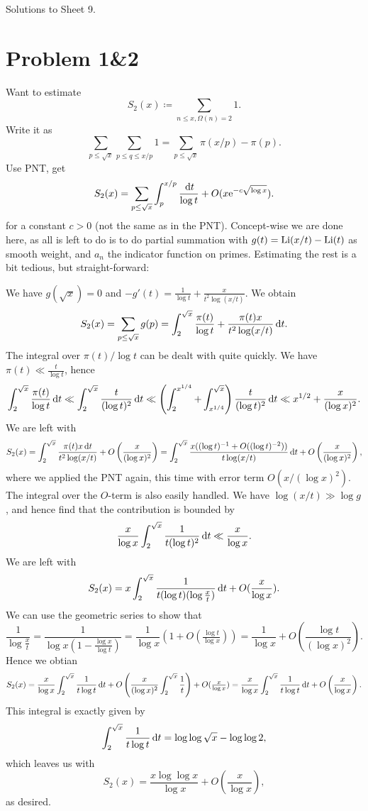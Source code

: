 \documentclass[a4paper,11pt]{article}
\author{Max von Consbruch}
\begin{document}
\begin{center}
    \huge{Solutions to Sheet 9.}
\end{center}

\section*{Problem 1\&2}

Want to estimate
\[
    S_2(x) \coloneqq \sum_{n \leq x, \Omega(n) = 2} 1.
\]
Write it as 
\[
    \sum_{p \leq \sqrt x} \sum_{p \leq q \leq x/p} 1 = \sum_{p \leq \sqrt x}
    \pi(x/p) - \pi(p).
\]
Use PNT, get 
\[
    S_2(x) = \sum_{p \leq \sqrt x} \int_p^{x/p} \frac {\mathrm{\,d} t}{\log t} +
    O(x \mathrm e^{-c\sqrt{\log x}} ).
\]
for a constant $c>0$ (not the same as in the PNT).
Concept-wise we are done here, as all is left to do is to do partial summation
with $g(t) = \mathrm{Li}(x/t) - \mathrm{Li}(t)$ as smooth weight, and $a_n$ the indicator
function on primes. Estimating the rest is a bit tedious, but straight-forward:

We have $g(\sqrt x) = 0$ and $-g'(t) = \frac 1 {\log t} + \frac{x}{t^2
\log(x/t)}$. We obtain
\[
    S_2(x) = \sum_{p \leq \sqrt x} g(p) = 
    \int_2^{\sqrt x} \frac{\pi(t)}{\log t} + \frac{\pi(t) x}{t^2 \log(x/t)}
    \mathrm{\,d} t.
\]
The integral over $\pi(t)/\log t$ can be dealt with quite quickly. We have 
$\pi(t) \ll \frac t{\log t}$, hence
\[
    \int_2^{\sqrt x} \frac{\pi(t)}{\log t} \mathrm{\,d} t
    \ll \int_2^{\sqrt x} \frac t{(\log t)^2} \mathrm{\,d} t
    \ll \left( \int_{2}^{x^{1/4}} + 
    \int_{x^{1/4}}^{\sqrt x} \right )\frac{t}{(\log t)^2} \mathrm{\,d} t 
    \ll x^{1/2} + \frac x{(\log x)^2}.
\]
We are left with
\[
    S_2(x) = \int_2^{\sqrt x} \frac{\pi(t) x \mathrm{\,d} t}{t^2 \log(x/t)} + O\left(\frac x
    {(\log x)^2}\right) = \int_2^{\sqrt x} \frac{x((\log t)^{-1} + O((\log t)^{-2}))}{t
\log(x/t)} \mathrm{\,d} t + O\left(\frac x{(\log x)^2}\right),
\]
where we applied the PNT again, this time with error term $O(x/(\log x)^2)$. 
The integral over the $O$-term is also easily handled. We have $\log(x/t) \gg
\log g$, and hence find that the contribution is bounded by 
\[
    \frac x{\log x} \int_2^{\sqrt x} \frac 1{t (\log t)^2} \mathrm{\,d} t
    \ll \frac x{\log x}. 
\]
We are left with
\[
    S_2(x) = x \int_2^{\sqrt x} \frac 1{t (\log t)(\log \tfrac xt)} \mathrm{\,d} t 
    + O(\frac x{\log x}).
\]
We can use the geometric series to show that 
\[
    \frac 1{\log \tfrac xt} = \frac 1{\log x (1- \tfrac{\log x}{\log t})}
    = \frac 1{\log x} \left( 1 + O(\tfrac {\log t}{\log x}) \right)
    = \frac 1 {\log x} + O\left(\frac{\log t}{(\log x)^2} \right).
\]
Hence we obtian
\[
    S_2(x) = \frac x{\log x} \int_2^{\sqrt x} \frac 1{t \log t} \mathrm{\,d} t
    + O\left(\frac x{(\log x)^2} \int_2^{\sqrt x} \frac 1t \right)+ O(\tfrac x{\log x}) 
    = \frac x{\log x} \int_2^{\sqrt x} \frac 1{t \log t} \mathrm{\,d} t + O\left( \frac
    {x}{\log x} \right).
\]
This integral is exactly given by 
\[
    \int_2^{\sqrt x} \frac 1{t \log t} \mathrm{\,d} t = 
    \log \log \sqrt x - \log \log 2,
\]
which leaves us with
\[
    S_2(x) = \frac{x \log \log x}{\log x} + O\left( \frac x{\log x}\right),
\]
as desired.
\end{document}
